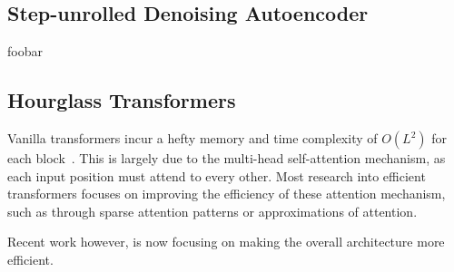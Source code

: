 \subsection{Step-unrolled Denoising Autoencoder}
\label{subsec:sundae}
foobar

\subsection{Hourglass Transformers}
\label{subsec:hourglass}

Vanilla transformers incur a hefty memory and time complexity of $O(L^2)$ for
each block~\cite{vaswani2017attention}. This is largely due to the multi-head
self-attention mechanism, as each input position must attend to every other.
Most research into efficient transformers focuses on improving the efficiency of
these attention mechanism, such as through sparse attention patterns or
approximations of attention.

Recent work however, is now focusing on making the overall architecture more
efficient.
